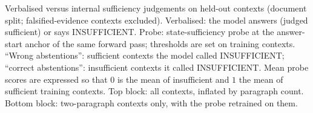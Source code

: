 \begin{table}[h]
\centering\scriptsize
\setlength{\tabcolsep}{3pt}

\caption{Verbalised versus internal sufficiency judgements on held-out contexts (document split; falsified-evidence contexts excluded). Verbalised: the model answers (judged sufficient) or says INSUFFICIENT. Probe: state-sufficiency probe at the answer-start anchor of the same forward pass; thresholds are set on training contexts. ``Wrong abstentions'': sufficient contexts the model called INSUFFICIENT; ``correct abstentions'': insufficient contexts it called INSUFFICIENT. Mean probe scores are expressed so that $0$ is the mean of insufficient and $1$ the mean of sufficient training contexts. Top block: all contexts, inflated by paragraph count. Bottom block: two-paragraph contexts only, with the probe retrained on them.}
\label{tab:verbal_internal}
\end{table}

